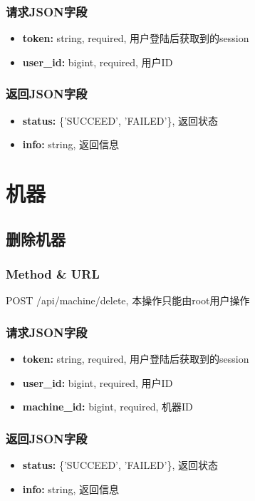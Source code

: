 ﻿\documentclass[a4paper]{report}
\begin{document}
\subsubsection{请求JSON字段}
\begin{itemize}
	\item \textbf{token:} string, required, 用户登陆后获取到的session
	\item \textbf{user\_id:} bigint, required, 用户ID
\end{itemize}

\subsubsection{返回JSON字段}
\begin{itemize}
	\item \textbf{status:} \{'SUCCEED', 'FAILED'\}, 返回状态
	\item \textbf{info:} string, 返回信息
\end{itemize}




\section{机器} %

\subsection{删除机器} %
\subsubsection{Method \& URL} %
POST /api/machine/delete, 本操作只能由root用户操作

\subsubsection{请求JSON字段}
\begin{itemize}
	\item \textbf{token:} string, required, 用户登陆后获取到的session
	\item \textbf{user\_id:} bigint, required, 用户ID
	\item \textbf{machine\_id:} bigint, required, 机器ID
\end{itemize}

\subsubsection{返回JSON字段}
\begin{itemize}
	\item \textbf{status:} \{'SUCCEED', 'FAILED'\}, 返回状态
	\item \textbf{info:} string, 返回信息
\end{itemize}
\end{document}
